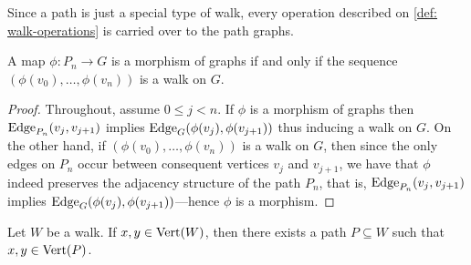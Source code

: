 Since a path is just a special type of walk, every operation described on
\cref{def: walk-operations} is carried over to the path graphs.

\begin{proposition}
\label{prop: morphism-path-walk}
A map \(\phi: P_n \to G\) is a morphism of graphs if and only if the sequence
\((\phi(v_0), \dots, \phi(v_n))\) is a walk on \(G\).
\end{proposition}

\begin{proof}
Throughout, assume \(0 \leq j < n\). If \(\phi\) is a morphism of graphs then
\(\operatorname{Edge}_{P_n}(v_j, v_{j + 1})\) implies \(\operatorname{Edge}_G(\phi(v_j), \phi(v_{j+1}))\) thus
inducing a walk on \(G\). On the other hand, if \((\phi(v_0), \dots,
\phi(v_n))\) is a walk on \(G\), then since the only edges on \(P_n\) occur
between consequent vertices \(v_j\) and \(v_{j+1}\), we have that \(\phi\)
indeed preserves the adjacency structure of the path \(P_n\), that is,
\(\operatorname{Edge}_{P_n}(v_j, v_{j+1})\) implies \(\operatorname{Edge}_G(\phi(v_j), \phi(v_{j+1}))\)---hence
\(\phi\) is a morphism.
\end{proof}

\begin{lemma}\label{lem: paths-on-walks}
Let \(W\) be a walk. If \(x, y \in \operatorname{Vert}(W)\), then there exists a path \(P
\subseteq W\) such that \(x, y \in \operatorname{Vert}(P)\).
\end{lemma}

